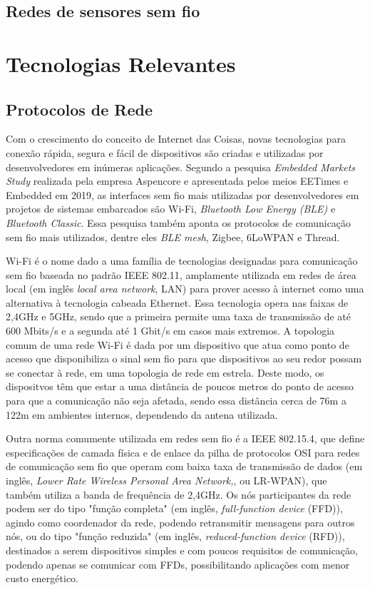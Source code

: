 \documentclass[../monografia.tex]{subfiles}
\begin{document}
\subsection{Redes de sensores sem fio}

\section{Tecnologias Relevantes} 
\subsection{Protocolos de Rede} 

Com o crescimento do conceito de Internet das Coisas, novas tecnologias para conexão rápida, segura e fácil de dispositivos são criadas e utilizadas por desenvolvedores em inúmeras aplicações. Segundo a pesquisa \textit{Embedded Markets Study} realizada pela empresa Aspencore\cite{embedded-market-study} e apresentada pelos meios EETimes\cite{eetimes} e Embedded\cite{embedded} em 2019, as interfaces sem fio mais utilizadas por desenvolvedores em  projetos de sistemas embarcados são Wi-Fi, \textit{Bluetooth Low Energy (BLE)} e \textit{Bluetooth Classic}. Essa pesquisa também aponta os protocolos de comunicação sem fio mais utilizados, dentre eles \textit{BLE mesh}, Zigbee, 6LoWPAN e Thread. 

Wi-Fi é o nome dado a uma família de tecnologias designadas para comunicação sem fio baseada no padrão IEEE 802.11\cite{802.11}, amplamente utilizada em redes de área local (em inglês \textit{local area network}, LAN) para prover acesso à internet como uma alternativa à tecnologia cabeada Ethernet. Essa tecnologia opera nas faixas de 2,4GHz e 5GHz, sendo que a primeira permite uma taxa de transmissão de até 600 Mbits/s e a segunda até 1 Gbit/s em casos mais extremos\cite{Wi-Fi-datarate}. A topologia comum de uma rede Wi-Fi é dada por um  dispositivo que atua como ponto de acesso que disponibiliza o sinal sem fio para que dispositivos ao seu redor possam se conectar à rede, em uma topologia de rede em estrela. Deste modo, os dispositvos têm que estar a uma distância de poucos metros do ponto de acesso para que a comunicação não seja afetada, sendo essa distância cerca de 76m a 122m em ambientes internos\cite{wifi-range}, dependendo da antena utilizada.

Outra norma comumente utilizada em redes sem fio é a IEEE 802.15.4, que define especificações de camada física e de enlace da pilha de protocolos OSI para redes de comunicação sem fio que operam com baixa taxa de transmissão de dados (em inglês, \textit{Lower Rate Wireless Personal Area Network,}, ou LR-WPAN), que também utiliza a banda de frequência de 2,4GHz\cite{802.15.4}. Os nós participantes da rede podem ser do tipo "função completa" (em inglês, \textit{full-function device} (FFD)), agindo como coordenador da rede, podendo retransmitir mensagens para outros nós, ou do tipo "função reduzida" (em inglês, \textit{reduced-function device} (RFD)), destinados a serem dispositivos simples e com poucos requisitos de comunicação, podendo apenas se comunicar com FFDs, possibilitando aplicações com menor custo energético. 
\end{document}
